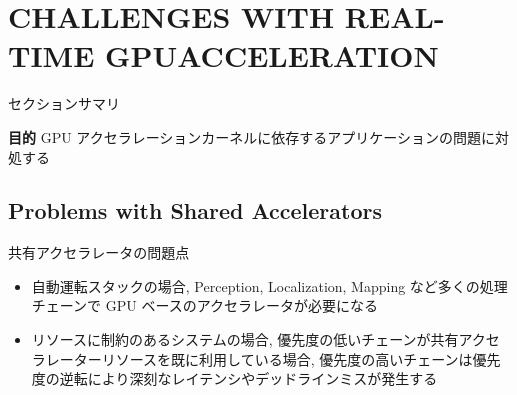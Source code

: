 
\section{CHALLENGES WITH REAL-TIME GPUACCELERATION}
\label{sec: challenges with real-time gpuacceleration}

\begin{frame}{セクションサマリ}
    \begin{itembox}[l]{\textbf{目的}}
        GPU アクセラレーションカーネルに依存するアプリケーションの問題に対処する
    \end{itembox}
\end{frame}



\subsection{Problems with Shared Accelerators}
\label{ssec: problems with shared accelerators}

\begin{frame}{共有アクセラレータの問題点}
    \begin{itemize}
        \item 自動運転スタックの場合, Perception, Localization, Mapping など多くの処理チェーンで GPU ベースのアクセラレータが必要になる
        \item リソースに制約のあるシステムの場合, 優先度の低いチェーンが共有アクセラレーターリソースを既に利用している場合, 優先度の高いチェーンは優先度の逆転により深刻なレイテンシやデッドラインミスが発生する
    \end{itemize}
\end{frame}



